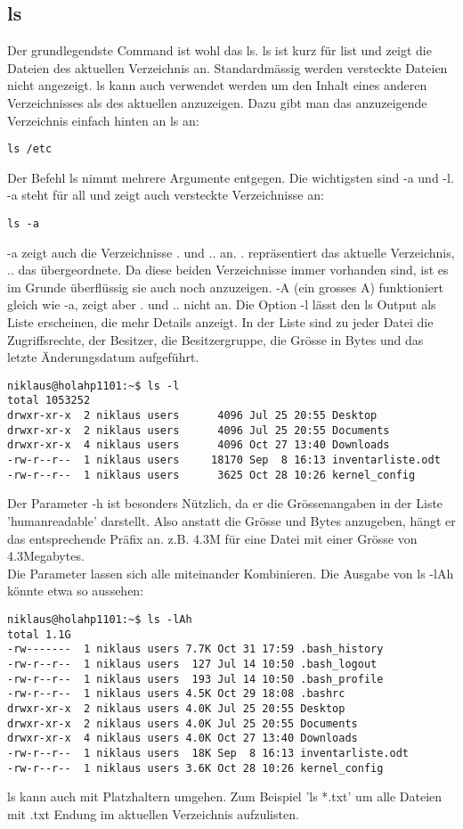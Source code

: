 \documentclass[10pt,paper=a4,final]{scrartcl}
\begin{document}
\subsection{ls}
Der grundlegendste Command ist wohl das ls. ls ist kurz f\"ur list und zeigt die Dateien des aktuellen Verzeichnis an. Standardm\"assig werden versteckte Dateien nicht angezeigt. ls kann auch verwendet werden um den Inhalt eines anderen Verzeichnisses als des aktuellen anzuzeigen. Dazu gibt man das anzuzeigende Verzeichnis einfach hinten an ls an:
\begin{lstlisting}[frame=single]
ls /etc
\end{lstlisting}
Der Befehl ls nimmt mehrere Argumente entgegen. Die wichtigsten sind -a und -l.\\
-a steht f\"ur all und zeigt auch versteckte Verzeichnisse an:
\begin{lstlisting}[frame=single]
ls -a
\end{lstlisting}
-a zeigt auch die Verzeichnisse . und .. an. . repr\"asentiert das aktuelle Verzeichnis, .. das \"ubergeordnete. Da diese beiden Verzeichnisse immer vorhanden sind, ist es im Grunde \"uberfl\"ussig sie auch noch anzuzeigen. -A (ein grosses A) funktioniert gleich wie -a, zeigt aber . und .. nicht an.
Die Option -l l\"asst den ls Output als Liste erscheinen, die mehr Details anzeigt. In der Liste sind zu jeder Datei die Zugriffsrechte, der Besitzer, die Besitzergruppe, die Gr\"osse in Bytes und das letzte \"Anderungsdatum aufgef\"uhrt.
\begin{lstlisting}[frame=single]
niklaus@holahp1101:~$ ls -l
total 1053252
drwxr-xr-x  2 niklaus users      4096 Jul 25 20:55 Desktop
drwxr-xr-x  2 niklaus users      4096 Jul 25 20:55 Documents
drwxr-xr-x  4 niklaus users      4096 Oct 27 13:40 Downloads
-rw-r--r--  1 niklaus users     18170 Sep  8 16:13 inventarliste.odt
-rw-r--r--  1 niklaus users      3625 Oct 28 10:26 kernel_config
\end{lstlisting}
Der Parameter -h ist besonders N\"utzlich, da er die Gr\"ossenangaben in der Liste 'humanreadable' darstellt. Also anstatt die Gr\"osse und Bytes anzugeben, h\"angt er das entsprechende Pr\"afix an. z.B. 4.3M f\"ur eine Datei mit einer Gr\"osse von 4.3Megabytes.\\
Die Parameter lassen sich alle miteinander Kombinieren. Die Ausgabe von ls -lAh k\"onnte etwa so aussehen:
\begin{lstlisting}[frame=single]
niklaus@holahp1101:~$ ls -lAh
total 1.1G
-rw-------  1 niklaus users 7.7K Oct 31 17:59 .bash_history
-rw-r--r--  1 niklaus users  127 Jul 14 10:50 .bash_logout
-rw-r--r--  1 niklaus users  193 Jul 14 10:50 .bash_profile
-rw-r--r--  1 niklaus users 4.5K Oct 29 18:08 .bashrc
drwxr-xr-x  2 niklaus users 4.0K Jul 25 20:55 Desktop
drwxr-xr-x  2 niklaus users 4.0K Jul 25 20:55 Documents
drwxr-xr-x  4 niklaus users 4.0K Oct 27 13:40 Downloads
-rw-r--r--  1 niklaus users  18K Sep  8 16:13 inventarliste.odt
-rw-r--r--  1 niklaus users 3.6K Oct 28 10:26 kernel_config
\end{lstlisting}
ls kann auch mit Platzhaltern umgehen. Zum Beispiel 'ls *.txt' um alle Dateien mit .txt Endung im aktuellen Verzeichnis aufzulisten.
\end{document}
